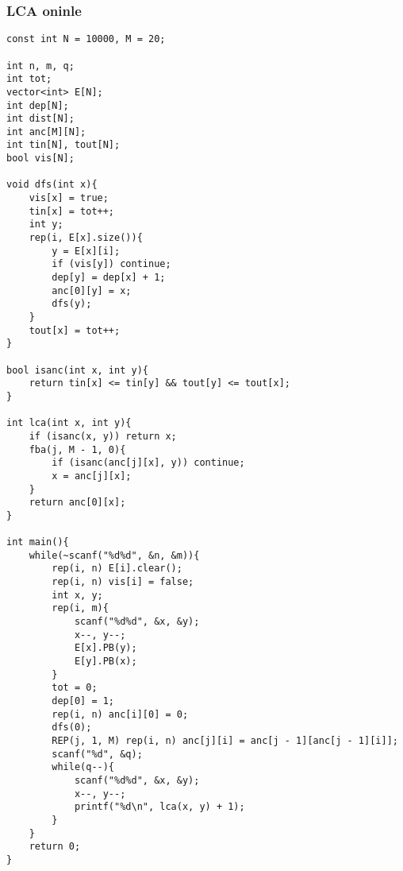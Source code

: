 \subsubsection{LCA oninle}
\begin{verbatim}
const int N = 10000, M = 20;

int n, m, q;
int tot;
vector<int> E[N];
int dep[N];
int dist[N];
int anc[M][N];
int tin[N], tout[N];
bool vis[N];

void dfs(int x){
    vis[x] = true;
    tin[x] = tot++;
    int y;
    rep(i, E[x].size()){
        y = E[x][i];
        if (vis[y]) continue;
        dep[y] = dep[x] + 1;
        anc[0][y] = x;
        dfs(y);
    }
    tout[x] = tot++;
}

bool isanc(int x, int y){
    return tin[x] <= tin[y] && tout[y] <= tout[x];
}

int lca(int x, int y){
    if (isanc(x, y)) return x;
    fba(j, M - 1, 0){
        if (isanc(anc[j][x], y)) continue;
        x = anc[j][x];
    }
    return anc[0][x];
}

int main(){
    while(~scanf("%d%d", &n, &m)){
        rep(i, n) E[i].clear();
        rep(i, n) vis[i] = false;
        int x, y;
        rep(i, m){
            scanf("%d%d", &x, &y);
            x--, y--;
            E[x].PB(y);
            E[y].PB(x);
        }
        tot = 0;
        dep[0] = 1;
        rep(i, n) anc[i][0] = 0;
        dfs(0);
        REP(j, 1, M) rep(i, n) anc[j][i] = anc[j - 1][anc[j - 1][i]];
        scanf("%d", &q);
        while(q--){
            scanf("%d%d", &x, &y);
            x--, y--;
            printf("%d\n", lca(x, y) + 1);
        }
    }
    return 0;
}
\end{verbatim}
